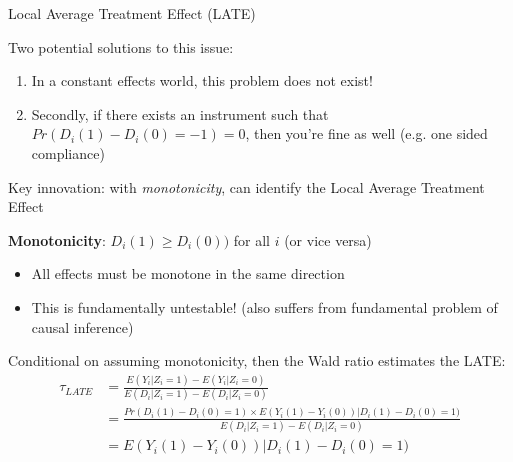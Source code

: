 \documentclass[notes,11pt, aspectratio=169]{beamer}
\newenvironment{wideitemize}{\itemize\addtolength{\itemsep}{10pt}}{\enditemize}
\begin{document}
\begin{frame}{Local Average Treatment Effect (LATE)}
  \begin{wideitemize}
  \item Two potential solutions to this issue:
    \begin{enumerate}
      \item In a constant effects world, this problem does not exist!
      \item Secondly, if there exists an instrument such that
        $Pr(D_{i}(1) - D_{i}(0) = -1) = 0$, then you're fine as well
        (e.g. one sided compliance)
    \end{enumerate}
  \item Key innovation: with \emph{monotonicity}, can identify the
    Local Average Treatment Effect
  \item \textbf{Monotonicity}: $D_{i}(1) \geq D_{i}(0))$ for all $i$ (or vice versa)
    \begin{itemize}
    \item All effects must be monotone in the same direction
    \item This is fundamentally untestable! (also suffers from
      fundamental problem of causal inference)
    \end{itemize}
    \vspace{-5pt}
  \item Conditional on assuming monotonicity, then the Wald ratio estimates the LATE:
    \begin{align*}
      \tau_{LATE}   & = \frac{E(Y_{i} | Z_{i} = 1) -E(Y_{i} | Z_{i} = 0)}{E(D_{i} | Z_{i} = 1) -E(D_{i} | Z_{i} = 0)} \\
      &=\frac{Pr(D_{i}(1) - D_{i}(0) = 1) \times E(Y_{i}(1) - Y_{i}(0)) | D_{i}(1) - D_{i}(0) = 1)}{E(D_{i} | Z_{i} = 1) -E(D_{i} | Z_{i} = 0)} \\
      &=E(Y_{i}(1) - Y_{i}(0)) | D_{i}(1) - D_{i}(0) = 1)
    \end{align*}
  \end{wideitemize}
\end{frame}
\end{document}

